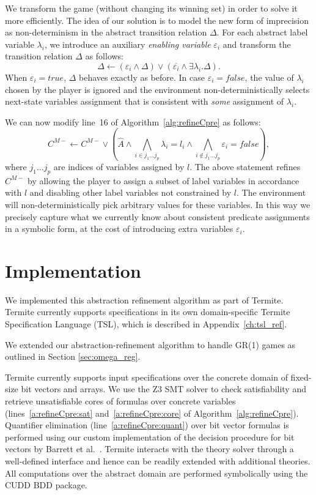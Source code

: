 We transform the game (without changing its winning set) in order to solve it more efficiently.  The idea of our solution is to model the new form of imprecision as non-determinism in the abstract transition relation $\Delta$.  For each abstract label variable $\lambda_i$, we introduce an auxiliary \emph{enabling variable} $\varepsilon_i$ and transform the transition relation $\Delta$ as follows:
$$
\Delta \gets (\varepsilon_i \land \Delta) \lor (\overline{\varepsilon_i} \land \exists \lambda_i. \Delta).
$$
When $\varepsilon_i=true$, $\Delta$ behaves exactly as before.  In case $\varepsilon_i=false$, the value of $\lambda_i$ chosen by the player is ignored and the environment non-deterministically selects next-state variables assignment that is consistent with \emph{some} assignment of $\lambda_i$. 

We can now modify line~16 of Algorithm~\ref{alg:refineCpre} as follows:
$$
C^{M-} \gets C^{M-} \lor (\hat{A}\land \bigwedge_{i\in{j_1\ldots j_p}}\lambda_i=l_i \land \bigwedge_{i\not\in{j_1\ldots j_p}}\varepsilon_i=false),
$$
where $j_1\ldots j_p$ are indices of variables assigned by $l$.  The above statement refines $C^{M-}$ by allowing the player to assign a subset of label variables in accordance with $l$ and disabling other label variables not constrained by $l$.  The environment will non-deterministically pick arbitrary values for these variables.  In this way we precisely capture what we currently know about consistent predicate assignments in a symbolic form, at the cost of introducing extra variables $\varepsilon_i$.

\section{Implementation}
We implemented this abstraction refinement algorithm as part of Termite. Termite currently supports specifications in its own domain-specific Termite Specification Language (TSL), which is described in Appendix~\ref{ch:tsl_ref}.

We extended our abstraction-refinement algorithm to handle GR(1) games as outlined in Section \ref{sec:omega_reg}.

Termite currently supports input specifications over the concrete domain of fixed-size bit vectors and arrays.  We use the Z3 SMT solver to check satisfiability and retrieve unsatisfiable cores of formulas over concrete variables (lines~\ref{a:refineCpre:sat} and~\ref{a:refineCpre:core} of Algorithm~\ref{alg:refineCpre}).  Quantifier elimination (line~\ref{a:refineCpre:quant}) over bit vector formulas is performed using our custom implementation of the decision procedure for bit vectors by Barrett et al.~\cite{Barrett_DL_98}.  Termite interacts with the theory solver through a well-defined interface and hence can be readily extended with additional theories.  All computations over the abstract domain are performed symbolically using the CUDD BDD package.  

